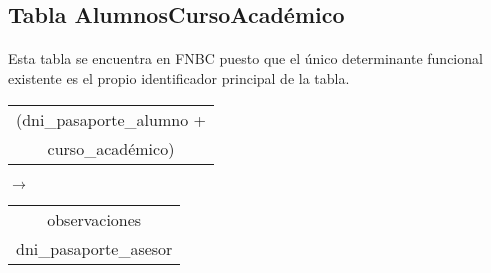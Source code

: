 \subsection{Tabla AlumnosCursoAcadémico}

  \paragraph{}Esta tabla se encuentra en FNBC puesto que el único
  determinante funcional existente es el propio identificador principal
  de la tabla.

 \begin{center}
    \begin{minipage}{5.0cm}{\begin{flushright}\begin{tabular}{ | c | }
                  \hline
                  (dni\_pasaporte\_alumno + \\
                  curso\_académico) \\
                  \hline
                 \end{tabular}\end{flushright} }
    \end{minipage}
    \begin{minipage}{0.7cm}{$\longrightarrow$}
    \end{minipage}
    \begin{minipage}{5.9cm}{\begin{tabular}{ | c | }
                  \hline
                  observaciones \\
                  dni\_pasaporte\_asesor \\
                  \hline
                 \end{tabular} }
    \end{minipage}
  \end{center}
